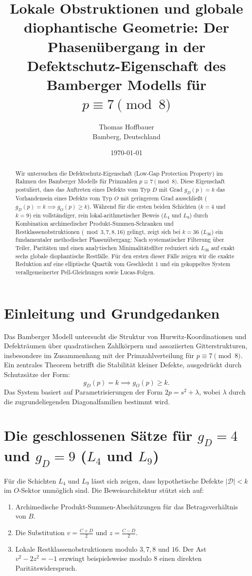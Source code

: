 \documentclass[11pt,a4paper]{article}
\title{\textbf{Lokale Obstruktionen und globale diophantische Geometrie: Der Phasenübergang in der Defektschutz-Eigenschaft des Bamberger Modells für $p \equiv 7 \pmod 8$}}
\author{Thomas Hoffbauer \\ \small Bamberg, Deutschland}
\date{\today}
\begin{document}
\maketitle

\begin{abstract}
Wir untersuchen die Defektschutz-Eigenschaft (Low-Gap Protection Property) im Rahmen des Bamberger Modells für Primzahlen $p \equiv 7 \pmod 8$. Diese Eigenschaft postuliert, dass das Auftreten eines Defekts vom Typ $D$ mit Grad $g_D(p) = k$ das Vorhandensein eines Defekts vom Typ $O$ mit geringerem Grad ausschließt ($g_D(p) = k \implies g_O(p) \ge k$). Während für die ersten beiden Schichten ($k = 4$ und $k = 9$) ein vollständiger, rein lokal-arithmetischer Beweis ($L_4$ und $L_9$) durch Kombination archimedischer Produkt-Summen-Schranken und Restklassenobstruktionen ($\bmod 3, 7, 8, 16$) gelingt, zeigt sich bei $k = 36$ ($L_{36}$) ein fundamentaler methodischer Phasenübergang: Nach systematischer Filterung über Teiler, Paritäten und einen analytischen Minimalitätsfilter reduziert sich $L_{36}$ auf exakt sechs globale diophantische Restfälle. Für den ersten dieser Fälle zeigen wir die exakte Reduktion auf eine elliptische Quartik vom Geschlecht $1$ und ein gekoppeltes System verallgemeinerter Pell-Gleichungen sowie Lucas-Folgen.
\end{abstract}

\section{Einleitung und Grundgedanken}
Das Bamberger Modell untersucht die Struktur von Hurwitz-Koordinationen und Defekträumen über quadratischen Zahlkörpern und assoziierten Gitterstrukturen, insbesondere im Zusammenhang mit der Primzahlverteilung für $p \equiv 7 \pmod 8$. Ein zentrales Theorem betrifft die Stabilität kleiner Defekte, ausgedrückt durch Schutzsätze der Form:
\begin{equation}
g_D(p) = k \implies g_O(p) \ge k.
\end{equation}
Das System basiert auf Parametrisierungen der Form $2p = s^2 + \lambda$, wobei $\lambda$ durch die zugrundeliegenden Diagonalfamilien bestimmt wird.

\section{Die geschlossenen Sätze für $g_D = 4$ und $g_D = 9$ ($L_4$ und $L_9$)}
Für die Schichten $L_4$ und $L_9$ lässt sich zeigen, dass hypothetische Defekte $|\mathscr{D}| < k$ im $O$-Sektor unmöglich sind. Die Beweisarchitektur stützt sich auf:
\begin{enumerate}
    \item Archimedische Produkt-Summen-Abschätzungen für das Betragsverhältnis von $B$.
    \item Die Substitution $v = \frac{C+D}{2}$ und $z = \frac{C-D}{2}$.
    \item Lokale Restklassenobstruktionen modulo $3, 7, 8$ und $16$. Der Ast $v^2 - 2z^2 = -1$ erzwingt beispielsweise modulo 8 einen direkten Paritätswiderspruch.
\end{enumerate}
\end{document}
